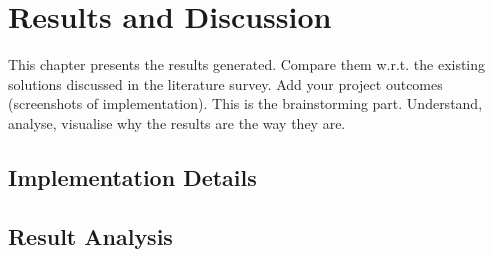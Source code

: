 \chapter{Results and Discussion}

This chapter presents the results generated. Compare them w.r.t. the existing solutions discussed in the literature survey. Add your project outcomes (screenshots of implementation). This is the brainstorming part. Understand, analyse, visualise why the results are the way they are. 

\section{Implementation Details}


\section{Result Analysis}

